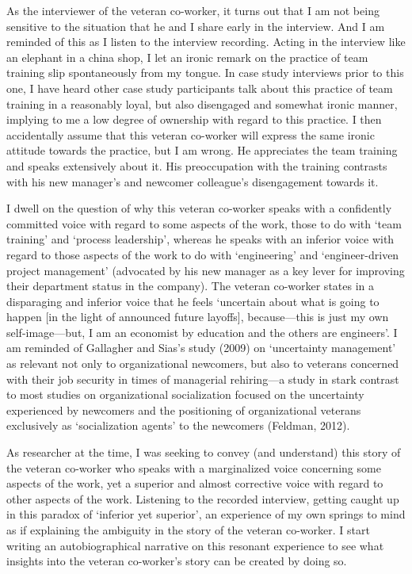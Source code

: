 As the interviewer of the veteran co-worker, it turns out that I am not being sensitive to the situation that he and I share early in the interview. And I am reminded of this as I listen to the interview recording. Acting in the interview like an elephant in a china shop, I let an ironic remark on the practice of team training slip spontaneously from my tongue. In case study interviews prior to this one, I have heard other case study participants talk about this practice of team training in a reasonably loyal, but also disengaged and somewhat ironic manner, implying to me a low degree of ownership with regard to this practice. I then accidentally assume that this veteran co-worker will express the same ironic attitude towards the practice, but I am wrong. He appreciates the team training and speaks extensively about it. His preoccupation with the training contrasts with his new manager’s and newcomer colleague’s disengagement towards it. 

I dwell on the question of why this veteran co-worker speaks with a confidently committed voice with regard to some aspects of the work, those to do with ‘team training’ and ‘process leadership’, whereas he speaks with an inferior voice with regard to those aspects of the work to do with ‘engineering’ and ‘engineer-driven project management’ (advocated by his new manager as a key lever for improving their department status in the company). The veteran co-worker states in a disparaging and inferior voice that he feels ‘uncertain about what is going to happen [in the light of announced future layoffs], because—this is just my own self-image—but, I am an economist by education and the others are engineers’. I am reminded of Gallagher and Sias’s study (2009) on ‘uncertainty management’ as relevant not only to organizational newcomers, but also to veterans concerned with their job security in times of managerial rehiring—a study in stark contrast to most studies on organizational socialization focused on the uncertainty experienced by newcomers and the positioning of organizational veterans exclusively as ‘socialization agents’ to the newcomers (Feldman, 2012).

As researcher at the time, I was seeking to convey (and understand) this story of the veteran co-worker who speaks with a marginalized voice concerning some aspects of the work, yet a superior and almost corrective voice with regard to other aspects of the work. Listening to the recorded interview, getting caught up in this paradox of ‘inferior yet superior’, an experience of my own springs to mind as if explaining the ambiguity in the story of the veteran co-worker. I start writing an autobiographical narrative on this resonant experience to see what insights into the veteran co-worker’s story can be created by doing so.

